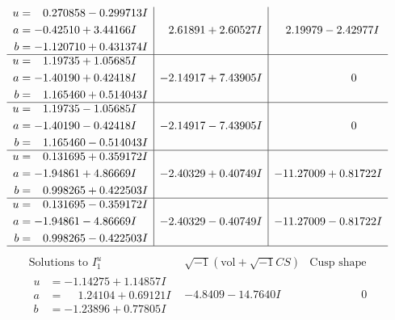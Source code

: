 \documentclass[1p]{elsarticle_modified}
\theoremstyle{definition}
\newcommand{\I}{\sqrt{-1}}
\begin{document}
$$\begin{array}{c|c|c}
\begin{aligned}
u &= \phantom{-}0.270858 - 0.299713 I \\
a &= -0.42510 + 3.44166 I \\
b &= -1.120710 + 0.431374 I\end{aligned}
 & \phantom{-}2.61891 + 2.60527 I & \phantom{-}2.19979 - 2.42977 I \\ \hline\begin{aligned}
u &= \phantom{-}1.19735 + 1.05685 I \\
a &= -1.40190 + 0.42418 I \\
b &= \phantom{-}1.165460 + 0.514043 I\end{aligned}
 & -2.14917 + 7.43905 I & \phantom{-0.000000 } 0 \\ \hline\begin{aligned}
u &= \phantom{-}1.19735 - 1.05685 I \\
a &= -1.40190 - 0.42418 I \\
b &= \phantom{-}1.165460 - 0.514043 I\end{aligned}
 & -2.14917 - 7.43905 I & \phantom{-0.000000 } 0 \\ \hline\begin{aligned}
u &= \phantom{-}0.131695 + 0.359172 I \\
a &= -1.94861 + 4.86669 I \\
b &= \phantom{-}0.998265 + 0.422503 I\end{aligned}
 & -2.40329 + 0.40749 I & -11.27009 + 0.81722 I \\ \hline\begin{aligned}
u &= \phantom{-}0.131695 - 0.359172 I \\
a &= -1.94861 - 4.86669 I \\
b &= \phantom{-}0.998265 - 0.422503 I\end{aligned}
 & -2.40329 - 0.40749 I & -11.27009 - 0.81722 I\\
 \hline 
 \end{array}$$\newpage$$\begin{array}{c|c|c}  
\text{Solutions to }I^u_{1}& \I (\text{vol} + \sqrt{-1}CS) & \text{Cusp shape}\\
 \hline 
\begin{aligned}
u &= -1.14275 + 1.14857 I \\
a &= \phantom{-}1.24104 + 0.69121 I \\
b &= -1.23896 + 0.77805 I\end{aligned}
 & -4.8409 - 14.7640 I & \phantom{-0.000000 } 0 \\ \hline\begin{aligned}

\end{aligned}
\end{array}$$
\end{document}
